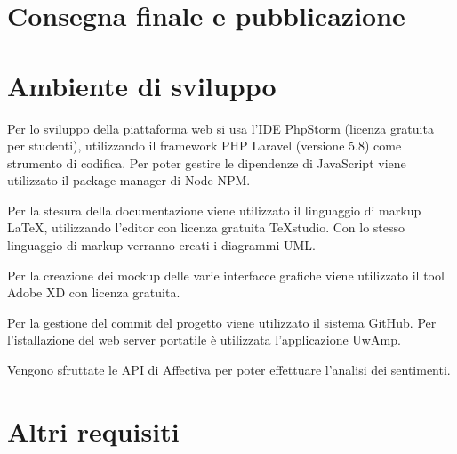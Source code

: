 \section{Consegna finale e pubblicazione}


\section{Ambiente di sviluppo}
Per lo sviluppo della piattaforma web si usa l'IDE PhpStorm (licenza gratuita 
per studenti), utilizzando il framework PHP Laravel (versione 5.8) come 
strumento di codifica. Per poter gestire le dipendenze di JavaScript viene 
utilizzato il package manager di Node NPM.

Per la stesura della documentazione viene utilizzato il linguaggio di markup 
LaTeX, utilizzando l'editor con licenza gratuita TeXstudio. Con lo stesso 
linguaggio di markup verranno creati i diagrammi UML.

Per la creazione dei mockup delle varie interfacce grafiche viene utilizzato il 
tool Adobe XD con licenza gratuita. 

Per la gestione del commit del progetto viene utilizzato il sistema GitHub. Per 
l'istallazione del web server portatile è utilizzata l'applicazione UwAmp.

Vengono sfruttate le API di Affectiva per poter effettuare l'analisi dei 
sentimenti.
\section{Altri requisiti}
